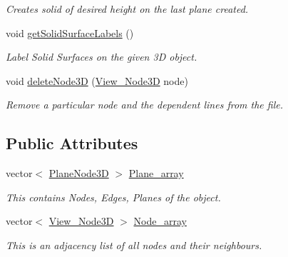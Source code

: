 \begin{DoxyCompactItemize}
\begin{DoxyCompactList}\small\item\em Creates solid of desired height on the last plane created. \end{DoxyCompactList}\item 
\mbox{\label{class_file3_d_a40804532ce3f05479dbab83f9b24c391}} 
void \mbox{\hyperlink{class_file3_d_a40804532ce3f05479dbab83f9b24c391}{get\+Solid\+Surface\+Labels}} ()
\begin{DoxyCompactList}\small\item\em Label Solid Surfaces on the given 3D object. \end{DoxyCompactList}\item 
\mbox{\label{class_file3_d_a95f460ce865a1d440855bb5ba313c967}} 
void \mbox{\hyperlink{class_file3_d_a95f460ce865a1d440855bb5ba313c967}{delete\+Node3D}} (\mbox{\hyperlink{class_view___node3_d}{View\+\_\+\+Node3D}} node)
\begin{DoxyCompactList}\small\item\em Remove a particular node and the dependent lines from the file. \end{DoxyCompactList}\end{DoxyCompactItemize}
\subsection*{Public Attributes}
\begin{DoxyCompactItemize}
\item 
\mbox{\label{class_file3_d_ac309b53a82cc8c8069d86f6b0f3f26e5}} 
vector$<$ \mbox{\hyperlink{class_plane_node3_d}{Plane\+Node3D}} $>$ \mbox{\hyperlink{class_file3_d_ac309b53a82cc8c8069d86f6b0f3f26e5}{Plane\+\_\+array}}
\begin{DoxyCompactList}\small\item\em This contains Nodes, Edges, Planes of the object. \end{DoxyCompactList}\item 
\mbox{\label{class_file3_d_aef3dca670f9cdc5a519142dc61f60104}} 
vector$<$ \mbox{\hyperlink{class_view___node3_d}{View\+\_\+\+Node3D}} $>$ \mbox{\hyperlink{class_file3_d_aef3dca670f9cdc5a519142dc61f60104}{Node\+\_\+array}}
\begin{DoxyCompactList}\small\item\em This is an adjacency list of all nodes and their neighbours. \end{DoxyCompactList}\end{DoxyCompactItemize}


